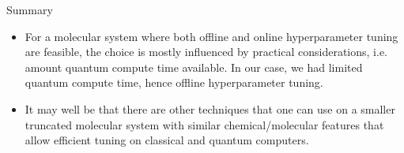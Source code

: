\begin{frame}{Summary}
   \begin{itemize}
    \setlength\itemsep{0.1em}
    \item For a molecular system where both offline and online hyperparameter tuning are feasible,
          the choice is mostly influenced by practical considerations, i.e. amount quantum
          compute time available. In our case, we had limited quantum compute time, hence
          offline hyperparameter tuning.

    \item It may well be that there are other techniques that one can use on a smaller
          truncated molecular system with similar chemical/molecular
          features that allow efficient tuning on classical and quantum computers.


   \end{itemize}
\end{frame}
